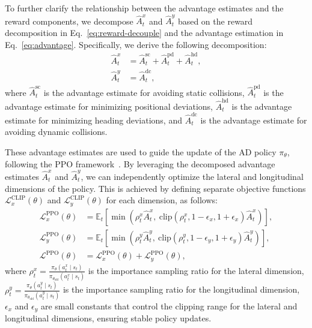 To further clarify the relationship between the advantage estimates and the reward components, we decompose $\hat{A}_t^x$ and $\hat{A}_t^y$ based on the reward decomposition in Eq.~\ref{eq:reward-decouple} and the advantage estimation in Eq.~\ref{eq:advantage}. Specifically, we derive the following decomposition:
\begin{equation}
\begin{aligned}
\hat{A}_t^x &= \hat{A}_t^{\text{sc}} + \hat{A}_t^{\text{pd}} + \hat{A}_t^{\text{hd}}, \\
\hat{A}_t^y &= \hat{A}_t^{\text{dc}},
\end{aligned}
\end{equation}
where $\hat{A}_t^{\text{sc}}$ is the advantage estimate for avoiding static collisions, $\hat{A}_t^{\text{pd}}$ is the advantage estimate for minimizing positional deviations, $\hat{A}_t^{\text{hd}}$ is the advantage estimate for minimizing heading deviations, and $\hat{A}_t^{\text{dc}}$ is the advantage estimate for avoiding dynamic collisions.

These advantage estimates are used to guide the update of the AD policy $\pi_{\theta}$, following the PPO framework~\cite{PPO}. By leveraging the decomposed advantage estimates $\hat{A}_t^x$ and $\hat{A}_t^y$, we can independently optimize the lateral and longitudinal dimensions of the policy. This is achieved by defining separate objective functions $\mathcal{L}_x^{\text{CLIP}}(\theta)$ and $\mathcal{L}_y^{\text{CLIP}}(\theta)$ for each dimension,  as follows:
\begin{equation}
\begin{aligned}
\mathcal{L}_x^{\text{PPO}}(\theta) &= \mathbb{E}_t \left[ \min \left( \rho_t^x \hat{A}_t^x, \ \text{clip}(\rho_t^x, 1-\epsilon_x, 1+\epsilon_x) \hat{A}_t^x \right) \right], \\
\mathcal{L}_y^{\text{PPO}}(\theta) &= \mathbb{E}_t \left[ \min \left( \rho_t^y \hat{A}_t^y, \ \text{clip}(\rho_t^y, 1-\epsilon_y, 1+\epsilon_y) \hat{A}_t^y \right) \right], \\
\mathcal{L}^{\text{PPO}}(\theta) &= \mathcal{L}_x^{\text{PPO}}(\theta) + \mathcal{L}_y^{\text{PPO}}(\theta),
\end{aligned}
\end{equation}
where $\rho_t^x = \frac{\pi_{\theta}(a_t^x \mid s_t)}{\pi_{\theta_{\text{old}}}(a_t^x \mid s_t)}$ is the importance sampling ratio for the lateral dimension, $\rho_t^y = \frac{\pi_{\theta}(a_t^y \mid s_t)}{\pi_{\theta_{\text{old}}}(a_t^y \mid s_t)}$ is the importance sampling ratio for the longitudinal dimension, $\epsilon_x$ and $\epsilon_y$ are small constants that control the clipping range for the lateral and longitudinal dimensions, ensuring stable policy updates.

